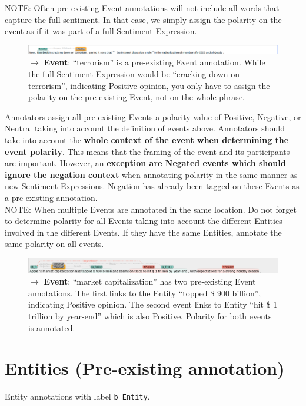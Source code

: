 \noindent
\textcolor{BrickRed}{NOTE: Often pre-existing Event annotations will not include all words that capture the full sentiment.
In that case, we simply assign the polarity on the event as if it was part of a full Sentiment Expression.}
\begin{figure}[h]
    \centering
    \includegraphics[width=\textwidth]{img/fb03 incomplemte event trigger example.png}
    \caption*{$\rightarrow$ \textbf{Event}: ``terrorism'' is a pre-existing Event annotation. While the full Sentiment Expression would be ``cracking down on terrorism'', indicating Positive opinion, you only have to assign the polarity on the pre-existing Event, not on the whole phrase.}
\end{figure}

Annotators assign all pre-existing Events a polarity value of Positive, Negative, or Neutral taking into account the definition of events above.
Annotators should take into account the \textbf{whole context of the event when determining the event polarity}.
This means that the framing of the event and its participants are important. However, an \textbf{exception are Negated events which should ignore the negation context} when annotating polarity in the same manner as new Sentiment Expressions. Negation has already been tagged on these Events as a pre-existing annotation.\\

\noindent
\textcolor{BrickRed}{NOTE: When multiple Events are annotated in the same location. Do not forget to determine polarity for all Events taking into account the different Entities involved in the different Events. If they have the same Entities, annotate the same polarity on all events.}
\begin{figure}[h]
    \centering
    \includegraphics[width=\textwidth]{img/aapl15 s04 two events in same place.png}
    \caption*{$\rightarrow$ \textbf{Event}: ``market capitalization'' has two pre-existing Event annotations. The first links to the Entity ``topped \$ 900 billion'', indicating Positive opinion. The second event links to Entity ``hit \$ 1 trillion by year-end'' which is also Positive. Polarity for both events is annotated.}
\end{figure}

\section{Entities (Pre-existing annotation)}
\label{sec:entitydefinition}
\entitycolor Entity annotations with label \texttt{b\_Entity}.
    
